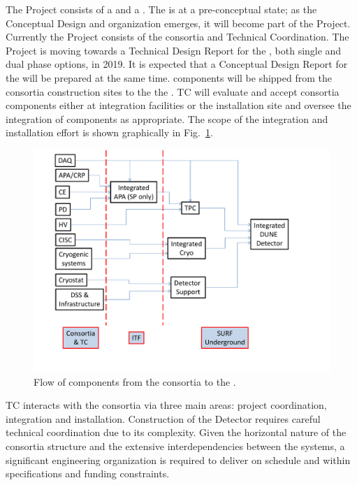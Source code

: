 The  Project consists of a  and a
. The  is at a pre-conceptual state; as the
Conceptual Design and organization emerges, it will become part of the
 Project. Currently the  Project consists of
the   consortia and Technical Coordination.  The
 Project is moving towards a Technical Design Report for
the , both single and dual phase options, in 2019. It is
expected that a Conceptual Design Report for the  will be
prepared at the same time.  components will be shipped
from the consortia construction sites to the the . TC will
evaluate and accept consortia components either at integration
facilities or the installation site and oversee the integration of
components as appropriate. The scope of the  integration
and installation effort is shown graphically in
Fig.~\ref{fig:TC_flow}.
\begin{figure}[htb]
  \begin{center}
    \includegraphics[width=\textwidth]{far-detector-generic/figures/DUNE_deliverable_flow}
    \caption{Flow of components from the consortia to the .}
    \label{fig:TC_flow}
  \end{center}
\end{figure}

TC interacts with the consortia via three main areas: project
coordination, integration and installation.  Construction of the
 Detector requires careful technical coordination due to
its complexity.  Given the horizontal nature of the consortia
structure and the extensive interdependencies between the systems, a
significant engineering organization is required to deliver
 on schedule and within specifications and funding
constraints.

